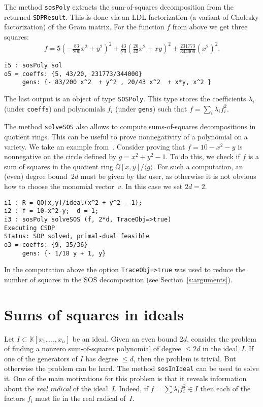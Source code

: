 \documentclass[11pt]{amsart}
\theoremstyle{plain}%
\theoremstyle{definition}
\theoremstyle{remark}
\newcommand{\SOS}{\textsc{SOS}\xspace}
\newcommand{\QQ}{\mathbb{Q}}
\newcommand{\kk}{\mathbb{K}}
\begin{document}
The method \verb|sosPoly| extracts the sum-of-squares decomposition from the returned \verb|SDPResult|.
This is done via an LDL factorization (a variant of Cholesky factorization) of the Gram matrix.
For the function $f$ from above we get three squares:
\[
  f = 5(-\tfrac{83}{200} x^{2}+y^{2})^{2} + \tfrac{43}{20}
  (\tfrac{20}{43}x^{2} + xy)^{2} + \tfrac{231773}{344000} (x^{2})^{2}.
\]
{\small
\begin{verbatim}
i5 : sosPoly sol
o5 = coeffs: {5, 43/20, 231773/344000}
     gens: {- 83/200 x^2  + y^2 , 20/43 x^2  + x*y, x^2 }
\end{verbatim}
}
\noindent
The last output is an object of type \verb|SOSPoly|.
This type stores the coefficients $\lambda_{i}$ (under \verb|coeffs|) and polynomials $f_{i}$ (under \verb|gens|) such that $f = \sum_{i}\lambda_{i}f_{i}^{2}$.

The method \verb|solveSOS| also allows to compute sums-of-squares decompositions in quotient rings.
This can be useful to prove nonnegativity of a polynomial on a variety.
We take an example from~\cite{parrilo2005exploiting}.
Consider proving that $f = 10{-}x^2{-}y$ is nonnegative on the circle defined by $g = x^2 {+} y^2 {-} 1$.
To do this, we check if $f$ is a sum of squares in the quotient ring $\QQ[x,y]/\langle g\rangle$.
For such a computation, an (even) degree bound~$2d$ must be given by the user, as otherwise it is not obvious how to choose the monomial vector~$v$.
In this case we set $2d=2$.
{\small
\begin{verbatim}
i1 : R = QQ[x,y]/ideal(x^2 + y^2 - 1);
i2 : f = 10-x^2-y;  d = 1;
i3 : sosPoly solveSOS (f, 2*d, TraceObj=>true)
Executing CSDP
Status: SDP solved, primal-dual feasible
o3 = coeffs: {9, 35/36}
     gens: {- 1/18 y + 1, y}
\end{verbatim}
}
\noindent
In the computation above the option \verb|TraceObj=>true| was used to reduce the number of squares in the SOS decomposition (see Section~\ref{s:arguments}).


\section{Sums of squares in ideals}
Let $I \subset \kk[x_{1},\dots,x_{n}]$ be an ideal.  
Given an even bound $2d$, consider the problem of finding a nonzero sum-of-squares polynomial of degree $\leq \!2d$ in the ideal~$I$.
If one of the generators of $I$ has degree $\leq \!d$, then the problem is trivial.
But otherwise the problem can be hard.
The method \verb|sosInIdeal| can be used to solve it.
One of the main motivations for this problem is that it reveals information about the \emph{real radical} of the ideal~$I$.
Indeed, if $f = \sum \lambda_i f_i^2 \in I$ then each of the factors $f_i$ must lie in the real radical of~$I$.
\end{document}
